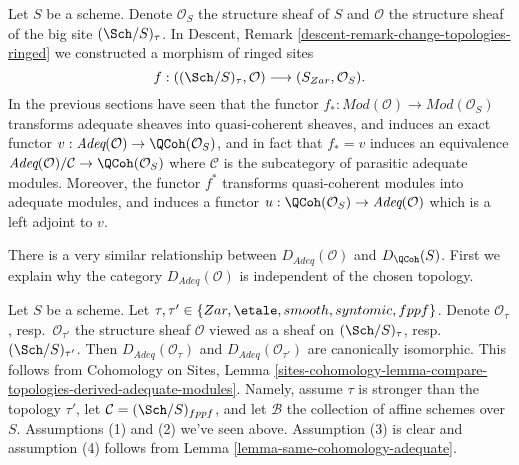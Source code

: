 \noindent
Let $S$ be a scheme. Denote $\mathcal{O}_S$ the structure sheaf of $S$
and $\mathcal{O}$ the structure sheaf of the big site $(\Sch/S)_\tau$.
In
Descent, Remark \ref{descent-remark-change-topologies-ringed}
we constructed a morphism of ringed sites
\begin{equation}
\label{equation-compare-big-small}
f :
((\Sch/S)_\tau, \mathcal{O})
\longrightarrow
(S_{Zar}, \mathcal{O}_S).
\end{equation}
In the previous sections have seen that the functor
$f_* : \textit{Mod}(\mathcal{O}) \to \textit{Mod}(\mathcal{O}_S)$
transforms adequate sheaves into quasi-coherent sheaves, and
induces an exact functor
$v : \textit{Adeq}(\mathcal{O}) \to \QCoh(\mathcal{O}_S)$, and
in fact that $f_* = v$ induces an equivalence
$\textit{Adeq}(\mathcal{O})/\mathcal{C} \to \QCoh(\mathcal{O}_S)$
where $\mathcal{C}$ is the subcategory of parasitic adequate modules.
Moreover, the functor $f^*$ transforms quasi-coherent modules
into adequate modules, and induces a functor
$u : \QCoh(\mathcal{O}_S) \to \textit{Adeq}(\mathcal{O})$
which is a left adjoint to $v$.

\medskip\noindent
There is a very similar relationship between
$D_{\textit{Adeq}}(\mathcal{O})$ and $D_\QCoh(S)$.
First we explain why the category $D_{\textit{Adeq}}(\mathcal{O})$
is independent of the chosen topology.

\begin{remark}
\label{remark-D-adeq-independence-topology}
Let $S$ be a scheme.
Let $\tau, \tau' \in \{Zar, \etale, smooth, syntomic, fppf\}$.
Denote $\mathcal{O}_\tau$, resp.\ $\mathcal{O}_{\tau'}$
the structure sheaf $\mathcal{O}$ viewed as a sheaf on
$(\Sch/S)_\tau$, resp.\ $(\Sch/S)_{\tau'}$.
Then $D_{\textit{Adeq}}(\mathcal{O}_\tau)$ and
$D_{\textit{Adeq}}(\mathcal{O}_{\tau'})$ are canonically isomorphic.
This follows from
Cohomology on Sites, Lemma
\ref{sites-cohomology-lemma-compare-topologies-derived-adequate-modules}.
Namely, assume $\tau$ is stronger than the topology $\tau'$, let
$\mathcal{C} = (\Sch/S)_{fppf}$, and let $\mathcal{B}$ the collection
of affine schemes over $S$. Assumptions (1) and (2) we've seen above.
Assumption (3) is clear and assumption (4) follows from
Lemma \ref{lemma-same-cohomology-adequate}.
\end{remark}

